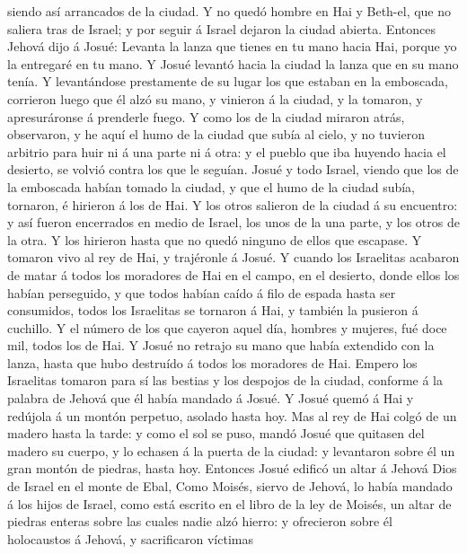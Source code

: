 siendo así arrancados de la ciudad.  Y no quedó hombre en
Hai y Beth-el, que no saliera tras de Israel; y por seguir á Israel
dejaron la ciudad abierta.  Entonces Jehová dijo á Josué:
Levanta la lanza que tienes en tu mano hacia Hai, porque yo la entregaré
en tu mano. Y Josué levantó hacia la ciudad la lanza que en su mano
tenía.  Y levantándose prestamente de su lugar los que
estaban en la emboscada, corrieron luego que él alzó su mano, y vinieron
á la ciudad, y la tomaron, y apresuráronse á prenderle fuego.
 Y como los de la ciudad miraron atrás, observaron, y he
aquí el humo de la ciudad que subía al cielo, y no tuvieron arbitrio
para huir ni á una parte ni á otra: y el pueblo que iba huyendo hacia el
desierto, se volvió contra los que le seguían.  Josué y
todo Israel, viendo que los de la emboscada habían tomado la ciudad, y
que el humo de la ciudad subía, tornaron, é hirieron á los de Hai.
 Y los otros salieron de la ciudad á su encuentro: y así
fueron encerrados en medio de Israel, los unos de la una parte, y los
otros de la otra. Y los hirieron hasta que no quedó ninguno de ellos que
escapase.  Y tomaron vivo al rey de Hai, y trajéronle á
Josué.  Y cuando los Israelitas acabaron de matar á todos
los moradores de Hai en el campo, en el desierto, donde ellos los habían
perseguido, y que todos habían caído á filo de espada hasta ser
consumidos, todos los Israelitas se tornaron á Hai, y también la
pusieron á cuchillo.  Y el número de los que cayeron aquel
día, hombres y mujeres, fué doce mil, todos los de Hai.  Y
Josué no retrajo su mano que había extendido con la lanza, hasta que
hubo destruído á todos los moradores de Hai.  Empero los
Israelitas tomaron para sí las bestias y los despojos de la ciudad,
conforme á la palabra de Jehová que él había mandado á Josué.
 Y Josué quemó á Hai y redújola á un montón perpetuo,
asolado hasta hoy.  Mas al rey de Hai colgó de un madero
hasta la tarde: y como el sol se puso, mandó Josué que quitasen del
madero su cuerpo, y lo echasen á la puerta de la ciudad: y levantaron
sobre él un gran montón de piedras, hasta hoy.  Entonces
Josué edificó un altar á Jehová Dios de Israel en el monte de Ebal,
 Como Moisés, siervo de Jehová, lo había mandado á los
hijos de Israel, como está escrito en el libro de la ley de Moisés, un
altar de piedras enteras sobre las cuales nadie alzó hierro: y
ofrecieron sobre él holocaustos á Jehová, y sacrificaron víctimas
